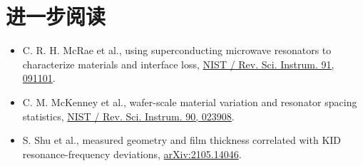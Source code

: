 \section*{进一步阅读}

\begin{itemize}
  \item C. R. H. McRae et al., using superconducting microwave resonators to characterize materials and interface loss, \href{https://www.nist.gov/publications/materials-loss-measurements-using-superconducting-microwave-resonators}{NIST / Rev. Sci. Instrum. 91, 091101}.
  \item C. M. McKenney et al., wafer-scale material variation and resonator spacing statistics, \href{https://www.nist.gov/publications/tile-and-trim-micro-resonator-array-fabrication-optimized-high-multiplexing-factors}{NIST / Rev. Sci. Instrum. 90, 023908}.
  \item S. Shu et al., measured geometry and film thickness correlated with KID resonance-frequency deviations, \href{https://arxiv.org/abs/2105.14046}{arXiv:2105.14046}.
\end{itemize}
